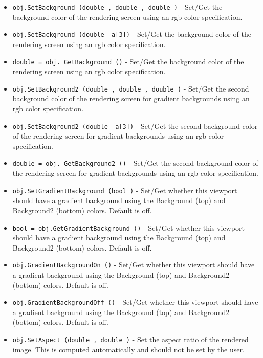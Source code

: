 \begin{itemize}
\item  \verb|obj.SetBackground (double , double , double )| -  Set/Get the background color of the rendering screen using an rgb color
 specification.

\item  \verb|obj.SetBackground (double  a[3])| -  Set/Get the background color of the rendering screen using an rgb color
 specification.

\item  \verb|double = obj. GetBackground ()| -  Set/Get the background color of the rendering screen using an rgb color
 specification.

\item  \verb|obj.SetBackground2 (double , double , double )| -  Set/Get the second background color of the rendering screen
 for gradient backgrounds using an rgb color specification.

\item  \verb|obj.SetBackground2 (double  a[3])| -  Set/Get the second background color of the rendering screen
 for gradient backgrounds using an rgb color specification.

\item  \verb|double = obj. GetBackground2 ()| -  Set/Get the second background color of the rendering screen
 for gradient backgrounds using an rgb color specification.

\item  \verb|obj.SetGradientBackground (bool )| -  Set/Get whether this viewport should have a gradient background
 using the Background (top) and Background2 (bottom) colors.
 Default is off.

\item  \verb|bool = obj.GetGradientBackground ()| -  Set/Get whether this viewport should have a gradient background
 using the Background (top) and Background2 (bottom) colors.
 Default is off.

\item  \verb|obj.GradientBackgroundOn ()| -  Set/Get whether this viewport should have a gradient background
 using the Background (top) and Background2 (bottom) colors.
 Default is off.

\item  \verb|obj.GradientBackgroundOff ()| -  Set/Get whether this viewport should have a gradient background
 using the Background (top) and Background2 (bottom) colors.
 Default is off.

\item  \verb|obj.SetAspect (double , double )| -  Set the aspect ratio of the rendered image. This is computed
 automatically and should not be set by the user.


\end{itemize}
